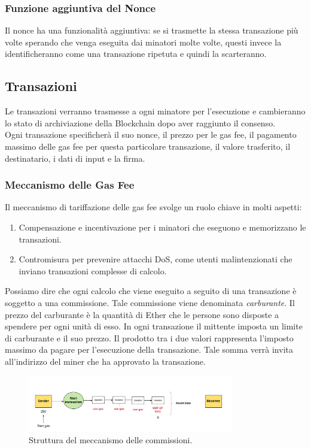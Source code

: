 \documentclass[a4paper,11pt]{report}
\begin{document}
\subsubsection{Funzione aggiuntiva del Nonce}
Il nonce ha una funzionalità aggiuntiva: se si trasmette la stessa transazione più volte sperando che venga eseguita dai minatori molte volte, questi invece la identificheranno come una transazione ripetuta e quindi la scarteranno.

\subsection{Transazioni}
Le transazioni verranno trasmesse a ogni minatore per l'esecuzione e cambieranno lo stato di archiviazione della Blockchain dopo aver raggiunto il consenso. \\
Ogni transazione specificherà il suo nonce, il prezzo per le gas fee, il pagamento massimo delle gas fee per questa particolare transazione, il valore trasferito, il destinatario, i dati di input e la firma.

\subsubsection{Meccanismo delle Gas Fee} 
Il meccanismo di tariffazione delle gas fee svolge un ruolo chiave in molti aspetti: 
\begin{enumerate}
\item  Compensazione e incentivazione per i minatori che eseguono e memorizzano le transazioni.
\item  Contromisura per prevenire attacchi DoS, come utenti malintenzionati che inviano transazioni complesse di calcolo.
\end{enumerate}
Possiamo dire che ogni calcolo che viene eseguito a seguito di una transazione è soggetto a una commissione. Tale commissione viene denominata \textit{carburante}.
Il prezzo del carburante è la quantità di Ether che le persone sono disposte a spendere per ogni unità di esso. In ogni transazione il mittente imposta un limite di carburante e il suo prezzo. Il prodotto tra i due valori rappresenta l'imposto massimo da pagare per l'esecuzione della transazione. Tale somma verrà invita all'indirizzo del miner che ha approvato la transazione.
\begin{figure}[htbp] 
\begin{center}
\includegraphics[width=9cm]{img/gas.png} 
\end{center}
\caption{Struttura del meccanismo delle commissioni. \cite{genesis}}
\end{figure}
\end{document}
